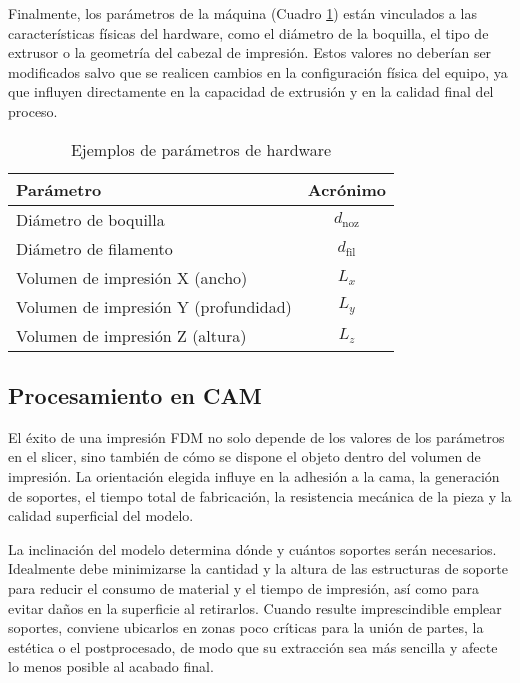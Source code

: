 Finalmente, los parámetros de la máquina (Cuadro \ref{tab:param-hardware}) están vinculados a las características físicas del hardware, como el diámetro de la boquilla, el tipo de extrusor o la geometría del cabezal de impresión. Estos valores no deberían ser modificados salvo que se realicen cambios en la configuración física del equipo, ya que influyen directamente en la capacidad de extrusión y en la calidad final del proceso.

\begin{table}[ht]
  \centering
  \caption{Ejemplos de parámetros de hardware}
  \label{tab:param-hardware}
  \begin{tabular}{@{} l c @{}}
    \toprule
    Parámetro                                   & Acrónimo   \\
    \midrule
    Diámetro de boquilla                        & $d_{\mathrm{noz}}$  \\
    Diámetro de filamento                       & $d_{\mathrm{fil}}$  \\
    Volumen de impresión X (ancho)              & $L_{x}$    \\
    Volumen de impresión Y (profundidad)        & $L_{y}$    \\
    Volumen de impresión Z (altura)             & $L_{z}$    \\
    \bottomrule
  \end{tabular}
\end{table}

\subsection{Procesamiento en CAM}

El éxito de una impresión FDM no solo depende de los valores de los parámetros en el slicer, sino también de cómo se dispone el objeto dentro del volumen de impresión. La orientación elegida influye en la adhesión a la cama, la generación de soportes, el tiempo total de fabricación, la resistencia mecánica de la pieza y la calidad superficial del modelo.

La inclinación del modelo determina dónde y cuántos soportes serán necesarios. Idealmente debe minimizarse la cantidad y la altura de las estructuras de soporte para reducir el consumo de material y el tiempo de impresión, así como para evitar daños en la superficie al retirarlos. Cuando resulte imprescindible emplear soportes, conviene ubicarlos en zonas poco críticas para la unión de partes, la estética o el postprocesado, de modo que su extracción sea más sencilla y afecte lo menos posible al acabado final.

